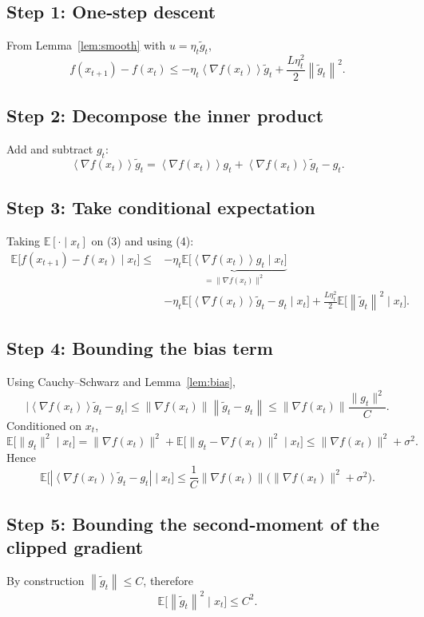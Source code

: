 \documentclass{article}
\newcommand{\E}{\mathbb{E}}
\newcommand{\norm}[1]{\left\lVert #1\right\rVert}
\newcommand{\inner}[1]{\left\langle #1\right\rangle}
\begin{document}
\subsection*{Step 1: One‑step descent}
From Lemma~\ref{lem:smooth} with $u=\eta_t\tilde g_t$,
\[
f(x_{t+1})-f(x_t)\le
-\eta_t\inner{\nabla f(x_t)}{\tilde g_t}
+\frac{L\eta_t^{2}}{2}\norm{\tilde g_t}^{2}. \tag{3}
\]

\subsection*{Step 2: Decompose the inner product}
Add and subtract $g_t$:
\[
\inner{\nabla f(x_t)}{\tilde g_t}
= \inner{\nabla f(x_t)}{g_t}
+\inner{\nabla f(x_t)}{\tilde g_t-g_t}. \tag{4}
\]

\subsection*{Step 3: Take conditional expectation}
Taking $\E[\cdot\mid x_t]$ on (3) and using (4):
\[
\begin{aligned}
\E\!\bigl[f(x_{t+1})-f(x_t)\mid x_t\bigr]
\le
&-\eta_t\underbrace{\E\!\bigl[\inner{\nabla f(x_t)}{g_t}\mid x_t\bigr]}_{= \|\nabla f(x_t)\|^{2}} \\
&-\eta_t\E\!\bigl[\inner{\nabla f(x_t)}{\tilde g_t-g_t}\mid x_t\bigr]
+\frac{L\eta_t^{2}}{2}\E\!\bigl[\norm{\tilde g_t}^{2}\mid x_t\bigr]. \tag{5}
\end{aligned}
\]

\subsection*{Step 4: Bounding the bias term}
Using Cauchy–Schwarz and Lemma~\ref{lem:bias},
\[
\bigl|\inner{\nabla f(x_t)}{\tilde g_t-g_t}\bigr|
\le \norm{\nabla f(x_t)}\norm{\tilde g_t-g_t}
\le \norm{\nabla f(x_t)}\frac{\|g_t\|^{2}}{C}. \tag{6}
\]
Conditioned on $x_t$,
\[
\E\!\bigl[\|g_t\|^{2}\mid x_t\bigr]
= \|\nabla f(x_t)\|^{2}
+\E\!\bigl[\|g_t-\nabla f(x_t)\|^{2}\mid x_t\bigr]
\le \|\nabla f(x_t)\|^{2}+\sigma^{2}.
\]
Hence
\[
\E\!\bigl[|\inner{\nabla f(x_t)}{\tilde g_t-g_t}|\mid x_t\bigr]
\le
\frac{1}{C}\norm{\nabla f(x_t)}\bigl(\|\nabla f(x_t)\|^{2}+\sigma^{2}\bigr). \tag{7}
\]

\subsection*{Step 5: Bounding the second‑moment of the clipped gradient}
By construction $\norm{\tilde g_t}\le C$, therefore
\[
\E\!\bigl[\norm{\tilde g_t}^{2}\mid x_t\bigr]\le C^{2}. \tag{8}
\]
\end{document}
